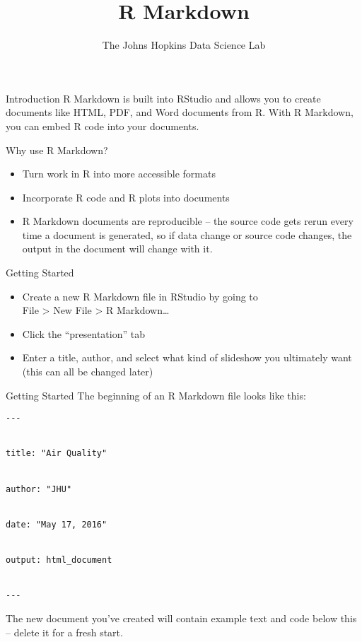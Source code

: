 \documentclass[
  ignorenonframetext,
]{beamer}
\title{R Markdown}
\author{The Johns Hopkins Data Science Lab}
\date{}
\providecommand{\tightlist}{%
  \setlength{\itemsep}{0pt}\setlength{\parskip}{0pt}}
\begin{document}
\frame{\titlepage}

\begin{frame}{Introduction}
\protect\hypertarget{introduction}{}
R Markdown is built into RStudio and allows you to create documents like
HTML, PDF, and Word documents from R. With R Markdown, you can embed R
code into your documents.

\begin{block}{Why use R Markdown?}
\protect\hypertarget{why-use-r-markdown}{}
\begin{itemize}
\tightlist
\item
  Turn work in R into more accessible formats
\item
  Incorporate R code and R plots into documents
\item
  R Markdown documents are reproducible -- the source code gets rerun
  every time a document is generated, so if data change or source code
  changes, the output in the document will change with it.
\end{itemize}
\end{block}
\end{frame}

\begin{frame}{Getting Started}
\protect\hypertarget{getting-started}{}
\begin{itemize}
\tightlist
\item
  Create a new R Markdown file in RStudio by going to\\
  File \textgreater{} New File \textgreater{} R Markdown\ldots{}
\item
  Click the ``presentation'' tab
\item
  Enter a title, author, and select what kind of slideshow you
  ultimately want (this can all be changed later)
\end{itemize}
\end{frame}

\begin{frame}[fragile]{Getting Started}
\protect\hypertarget{getting-started-1}{}
The beginning of an R Markdown file looks like this:

\texttt{-\/-\/-}\strut \\
\texttt{title:\ "Air\ Quality"}\strut \\
\texttt{author:\ "JHU"}\strut \\
\texttt{date:\ "May\ 17,\ 2016"}\strut \\
\texttt{output:\ html\_document}\strut \\
\texttt{-\/-\/-}

The new document you've created will contain example text and code below
this -- delete it for a fresh start.
\end{frame}
\end{document}
